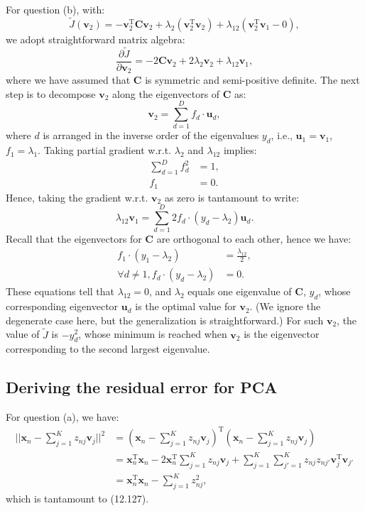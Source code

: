 \documentclass[UTF8]{ctexart}
\begin{document}
For question (b), with:
$$\tilde{J}(\textbf{v}_{2})=-\textbf{v}_{2}^{\text{T}}\textbf{C}\textbf{v}_{2}+\lambda_{2}(\textbf{v}_{2}^{\text{T}}\textbf{v}_{2})+\lambda_{12}(\textbf{v}_{2}^{\text{T}}\textbf{v}_{1}-0),$$
we adopt straightforward matrix algebra:
$$\frac{\partial \tilde{J}}{\partial \textbf{v}_{2}}=-2\textbf{C}\textbf{v}_{2}+2\lambda_{2}\textbf{v}_{2}+\lambda_{12}\textbf{v}_{1},$$
where we have assumed that $\textbf{C}$ is symmetric and semi-positive definite.
The next step is to decompose $\textbf{v}_{2}$ along the eigenvectors of $\textbf{C}$ as:
$$\textbf{v}_{2}=\sum_{d=1}^{D}f_{d}\cdot \textbf{u}_{d},$$
where $d$ is arranged in the inverse order of the eigenvalues $y_{d}$, i.e., $\textbf{u}_{1}=\textbf{v}_{1}$, $f_{1}=\lambda_{1}.$
Taking partial gradient w.r.t. $\lambda_{2}$ and $\lambda_{12}$ implies:
$$
\begin{aligned}
\sum_{d=1}^{D}f_{d}^{2}&=1,\\
f_{1}&=0.
\end{aligned}
$$
Hence, taking the gradient w.r.t. $\textbf{v}_{2}$ as zero is tantamount to write:
$$\lambda_{12}\textbf{v}_{1}=\sum_{d=1}^{D}2f_{d}\cdot(y_{d}-\lambda_{2})\textbf{u}_{d}.$$
Recall that the eigenvectors for $\textbf{C}$ are orthogonal to each other, hence we have:
$$
\begin{aligned}
f_{1}\cdot(y_{1}-\lambda_{2})&=\frac{\lambda_{12}}{2},\\
\forall d\neq 1,f_{d}\cdot(y_{d}-\lambda_{2})&=0.
\end{aligned}
$$
These equations tell that $\lambda_{12}=0$, and $\lambda_{2}$ equals one eigenvalue of $\textbf{C}$, $y_{d}$, whose corresponding eigenvector $\textbf{u}_{d}$ is the optimal value for $\textbf{v}_{2}$.
(We ignore the degenerate case here, but the generalization is straightforward.)
For such $\textbf{v}_{2}$, the value of $\tilde{J}$ is $-y_{d}^{2}$, whose minimum is reached when $\textbf{v}_{2}$ is the eigenvector corresponding to the second largest eigenvalue.



\subsection{Deriving the residual error for PCA}
For question (a), we have:
$$
\begin{aligned}
||\textbf{x}_{n}-\sum_{j=1}^{K}z_{nj}\textbf{v}_{j}||^{2}&=\left(\textbf{x}_{n}-\sum_{j=1}^{K}z_{nj}\textbf{v}_{j}\right)^{\text{T}}\left(\textbf{x}_{n}-\sum_{j=1}^{K}z_{nj}\textbf{v}_{j}\right)\\
&=\textbf{x}_{n}^{\text{T}}\textbf{x}_{n}-2\textbf{x}_{n}^{\text{T}}\sum_{j=1}^{K}z_{nj}\textbf{v}_{j}+\sum_{j=1}^{K}\sum_{j'=1}^{K}z_{nj}z_{nj'}\textbf{v}_{j}^{\text{T}}\textbf{v}_{j'}\\
&=\textbf{x}_{n}^{\text{T}}\textbf{x}_{n}-\sum_{j=1}^{K}z_{nj}^{2},
\end{aligned}
$$
which is tantamount to (12.127).
\end{document}
